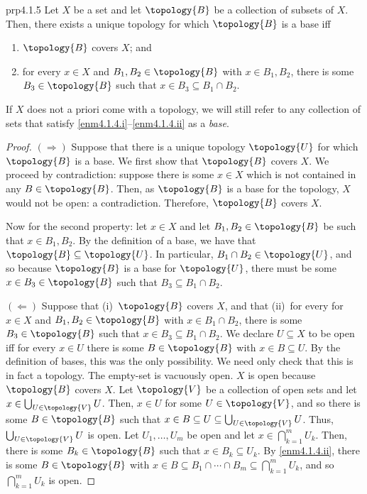 \begin{prp}{}{prp4.1.5}
Let $X$ be a set and let $\topology{B}$ be a collection of subsets of $X$.  Then, there exists a unique topology for which $\topology{B}$ is a base iff
\begin{enumerate}
\item \label{enm4.1.4.i}$\topology{B}$ covers $X$; and
\item \label{enm4.1.4.ii}for every $x\in X$ and $B_1,B_2\in \topology{B}$ with $x\in B_1,B_2$, there is some $B_3\in \topology{B}$ such that $x\in B_3\subseteq B_1\cap B_2$.
\end{enumerate}
\begin{rmk}
If $X$ does not a priori come with a topology, we will still refer to any collection of sets that satisfy \cref{enm4.1.4.i}--\cref{enm4.1.4.ii} as a \emph{base}.
\end{rmk}
\begin{proof}
$(\Rightarrow )$ Suppose that there is a unique topology $\topology{U}$ for which $\topology{B}$ is a base.  We first show that $\topology{B}$ covers $X$.  We proceed by contradiction:  suppose there is some $x\in X$ which is not contained in any $B\in \topology{B}$.  Then, as $\topology{B}$ is a base for the topology, $X$ would not be open:  a contradiction.  Therefore, $\topology{B}$ covers $X$.

Now for the second property:  let $x\in X$ and let $B_1,B_2\in \topology{B}$ be such that $x\in B_1,B_2$.  By the definition of a base, we have that $\topology{B}\subseteq \topology{U}$.  In particular, $B_1\cap B_2\in \topology{U}$, and so because $\topology{B}$ is a base for $\topology{U}$, there must be some $x\in B_3\in \topology{B}$ such that $B_3\subseteq B_1\cap B_2$.

\blankline
\noindent
$(\Leftarrow )$ Suppose that (i)~$\topology{B}$ covers $X$, and that (ii)~for every for $x\in X$ and $B_1,B_2\in \topology{B}$ with $x\in B_1\cap B_2$, there is some $B_3\in \topology{B}$ such that $x\in B_3\subseteq B_1\cap B_2$.  We declare $U\subseteq X$ to be open iff for every $x\in U$ there is some $B\in \topology{B}$ with $x\in B\subseteq U$.  By the definition of bases, this was the only possibility.  We need only check that this is in fact a topology.  The empty-set is vacuously open.  $X$ is open because $\topology{B}$ covers $X$.  Let $\topology{V}$ be a collection of open sets and let $x\in \bigcup _{U\in \topology{V}}U$.  Then, $x\in U$ for some $U\in \topology{V}$, and so there is some $B\in \topology{B}$ such that $x\in B\subseteq U\subseteq \bigcup _{U\in \topology{V}}U$.  Thus, $\bigcup _{U\in \topology{V}}U$ is open.  Let $U_1,\ldots ,U_m$ be open and let $x\in \bigcap _{k=1}^mU_k$.  Then, there is some $B_k\in \topology{B}$ such that $x\in B_k\subseteq U_k$.  By \cref{enm4.1.4.ii}, there is some $B\in \topology{B}$ with $x\in B\subseteq B_1\cap \cdots \cap B_m\subseteq \bigcap _{k=1}^mU_k$, and so $\bigcap _{k=1}^mU_k$ is open.
\end{proof}
\end{prp}
